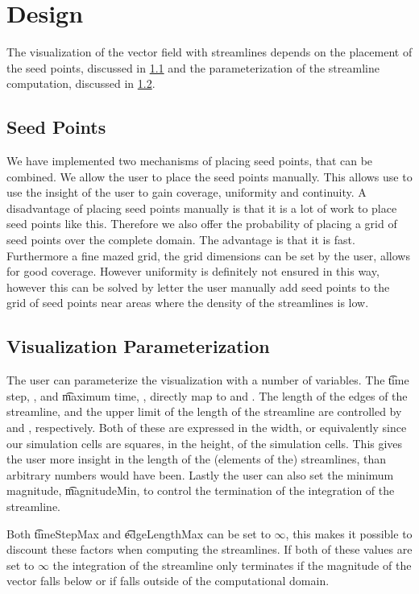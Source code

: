 \section{Design}
\label{s:streamlines:design}
The visualization of the vector field with streamlines depends on the placement of the seed points, discussed in \cref{ss:streamlines:design:seedpoints} and the parameterization of the streamline computation, discussed in \cref{ss:streamlines:design:parameterization}.

\subsection{Seed Points}
\label{ss:streamlines:design:seedpoints}
We have implemented two mechanisms of placing seed points, that can be combined. We allow the user to place the seed points manually. This allows use to use the insight of the user to gain coverage, uniformity and continuity. A disadvantage of placing seed points manually is that it is a lot of work to place seed points like this. Therefore we also offer the probability of placing a grid of seed points over the complete domain. The advantage is that it is fast. Furthermore a fine mazed grid, the grid dimensions can be set by the user, allows for good coverage. However uniformity is definitely not ensured in this way, however this can be solved by letter the user manually add seed points to the grid of seed points near areas where the density of the streamlines is low.

\subsection{Visualization Parameterization}
\label{ss:streamlines:design:parameterization}
The user can parameterize the visualization with a number of variables. The \t{time step}, \timeStep, and \t{maximum time}, \timeStepMax, directly map to \integrationTime and \timeInterval. The length of the edges of the streamline, and the upper limit of the length of the streamline are controlled by \edgeLength and \edgeLengthMax, respectively. Both of these are expressed in the width, or equivalently since our simulation cells are squares, in the height, of the simulation cells. This gives the user more insight in the length of the (elements of the) streamlines, than arbitrary numbers would have been. Lastly the user can also set the minimum magnitude, \t{magnitudeMin}, to control the termination of the integration of the streamline.

Both \t{timeStepMax} and \t{edgeLengthMax} can be set to $\infty$, this makes it possible to discount these factors when computing the streamlines. If both of these values are set to $\infty$ the integration of the streamline only terminates if the magnitude of the vector falls below \magnitudeMin or if  falls outside of the computational domain.
